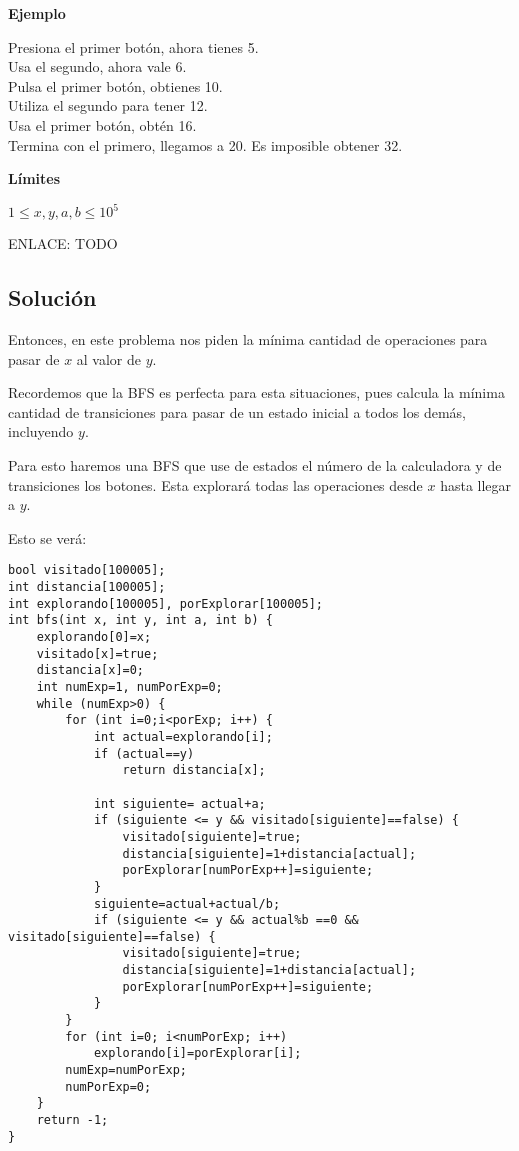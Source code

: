 \textbf{Ejemplo}\\
\begin{casebox3}
	{	Presiona el primer botón, ahora tienes 5.\\		
		Usa el segundo, ahora vale 6.\\
		Pulsa el primer botón, obtienes 10.\\
		Utiliza el segundo para tener 12.\\
		Usa el primer botón, obtén 16.\\
		Termina con el primero, llegamos a 20.
	}
	{	Es imposible obtener 32.
	}
\end{casebox3}

\textbf{Límites}
\begin{plimits}
	\item \(1\leq x,y,a,b \leq 10^5\)
\end{plimits}

ENLACE: TODO

\subsection*{Solución}
Entonces, en este problema nos piden la mínima cantidad de operaciones para pasar de \(x\) al valor de \(y\).

Recordemos que la BFS es perfecta para esta situaciones, pues calcula la mínima cantidad de transiciones para pasar de un estado inicial a todos los demás, incluyendo \(y\).

Para esto haremos una BFS que use de estados el número de la calculadora y de transiciones los botones. Esta explorará todas las operaciones desde \(x\) hasta llegar a \(y\).

Esto se verá:

\begin{minipage}{\linewidth}
\begin{lstlisting}
bool visitado[100005];
int distancia[100005];
int explorando[100005], porExplorar[100005];
int bfs(int x, int y, int a, int b) {
	explorando[0]=x;
	visitado[x]=true;
	distancia[x]=0;
	int numExp=1, numPorExp=0;
	while (numExp>0) {
		for (int i=0;i<porExp; i++) {
			int actual=explorando[i];
			if (actual==y)
				return distancia[x];
			
			int siguiente= actual+a;
			if (siguiente <= y && visitado[siguiente]==false) {
				visitado[siguiente]=true;
				distancia[siguiente]=1+distancia[actual];
				porExplorar[numPorExp++]=siguiente;
			}
			siguiente=actual+actual/b;
			if (siguiente <= y && actual%b ==0 && visitado[siguiente]==false) {				
				visitado[siguiente]=true;
				distancia[siguiente]=1+distancia[actual];				
				porExplorar[numPorExp++]=siguiente;
			}
		}
		for (int i=0; i<numPorExp; i++)
			explorando[i]=porExplorar[i];
		numExp=numPorExp; 
		numPorExp=0;
	}
	return -1;
}
\end{lstlisting}
\end{minipage}

